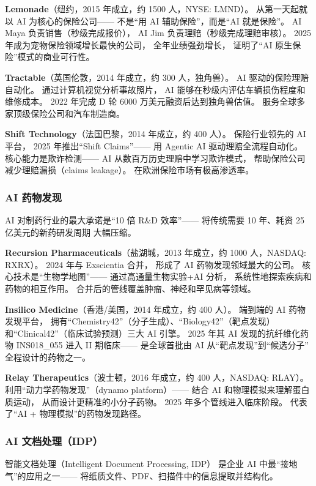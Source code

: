 \textbf{Lemonade}（纽约，2015 年成立，约 1500 人，NYSE: LMND）。
从第一天起就以 AI 为核心的保险公司——
不是``用 AI 辅助保险''，而是``AI 就是保险''。
AI Maya 负责销售（秒级完成报价），
AI Jim 负责理赔（秒级完成理赔审核）。
2025 年成为宠物保险领域增长最快的公司，
全年业绩强劲增长，
证明了``AI 原生保险''模式的商业可行性。

\textbf{Tractable}（英国伦敦，2014 年成立，约 300 人，独角兽）。
AI 驱动的保险理赔自动化。
通过计算机视觉分析事故照片，
AI 能够在秒级内评估车辆损伤程度和维修成本。
2022 年完成 D 轮 6000 万美元融资后达到独角兽估值。
服务全球多家顶级保险公司和汽车制造商。

\textbf{Shift Technology}（法国巴黎，2014 年成立，约 400 人）。
保险行业领先的 AI 平台，
2025 年推出``Shift Claims''——
用 Agentic AI 驱动理赔全流程自动化。
核心能力是欺诈检测——
AI 从数百万历史理赔中学习欺诈模式，
帮助保险公司减少理赔漏损（claims leakage）。
在欧洲保险市场有极高渗透率。

\subsubsection{AI 药物发现}

AI 对制药行业的最大承诺是``10 倍 R\&D 效率''——
将传统需要 10 年、耗资 25 亿美元的新药研发周期
大幅压缩。

\textbf{Recursion Pharmaceuticals}（盐湖城，2013 年成立，约 1000 人，NASDAQ: RXRX）。
2024 年与 Exscientia 合并，
形成了 AI 药物发现领域最大的公司。
核心技术是``生物学地图''——
通过高通量生物实验+AI 分析，
系统性地探索疾病和药物的相互作用。
合并后的管线覆盖肿瘤、神经和罕见病等领域。

\textbf{Insilico Medicine}（香港/美国，2014 年成立，约 400 人）。
端到端的 AI 药物发现平台，
拥有``Chemistry42''（分子生成）、``Biology42''（靶点发现）
和``Clinical42''（临床试验预测）三大 AI 引擎。
2025 年其 AI 发现的抗纤维化药物 INS018\_055 进入 II 期临床——
是全球首批由 AI 从``靶点发现''到``候选分子''
全程设计的药物之一。

\textbf{Relay Therapeutics}（波士顿，2016 年成立，约 400 人，NASDAQ: RLAY）。
利用``动力学药物发现''（dynamo platform）——
结合 AI 和物理模拟来理解蛋白质运动，
从而设计更精准的小分子药物。
2025 年多个管线进入临床阶段。
代表了``AI + 物理模拟''的药物发现路径。

\subsubsection{AI 文档处理（IDP）}

智能文档处理（Intelligent Document Processing, IDP）
是企业 AI 中最``接地气''的应用之一——
将纸质文件、PDF、扫描件中的信息提取并结构化。

